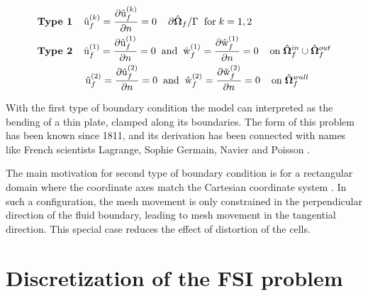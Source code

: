 \begin{align*}
&\textbf{Type 1} \hspace{4mm} \ha{u}_f^{(k)} = \pder{\ha{u}_f^{(k)}}{n} = 0 \hspace{4mm} \partial \hat{\Omega}_f / \Gamma \hspace{2mm} \text{for} \hspace{1mm} k = 1, 2 \\
&\textbf{Type 2} \hspace{4mm} \ha{u}_f^{(1)} = \pder{\ha{u}_f^{(1)}}{n} = 0 
\hspace{2mm} \text{and} \hspace{2mm} \ha{w}_f^{(1)} = \pder{\ha{w}_f^{(1)}}{n} = 0 \hspace{4mm} \text{on} \hspace{1mm} \hat{\Omega}_f^{in} \cup \hat{\Omega}_f^{out} \\ 
&\hspace{17mm}  \ha{u}_f^{(2)} = \pder{\ha{u}_f^{(2)}}{n} = 0 
\hspace{2mm} \text{and} \hspace{2mm} \ha{w}_f^{(2)} = \pder{\ha{w}_f^{(2)}}{n} = 0 \hspace{4mm} \text{on} \hspace{1mm}  \hat{\Omega}_f^{wall}
\end{align*}

With the first type of boundary condition the model can interpreted as the bending of a thin plate, clamped along its boundaries. The form of this problem has been known since 1811, and its derivation has been connected with names like  French scientists Lagrange, Sophie Germain, Navier and Poisson \cite{Meleshko1997}.  

The main motivation for second type of boundary condition is for a rectangular domain where the coordinate axes match the Cartesian coordinate system \cite{Wicka}. In such a configuration, the mesh movement is only constrained in the perpendicular direction of the fluid boundary, leading to mesh movement in the tangential direction. This special case reduces the effect of distortion of the cells.  

\newpage
\section{Discretization of the FSI problem}






